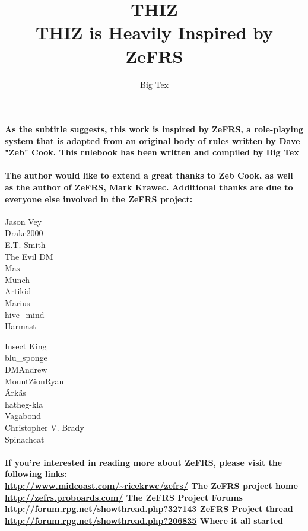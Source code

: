 \documentclass[oneside]{book}
\begin{document}
\title{ {\Huge THIZ} \\ \vspace{2 mm} {\large THIZ is Heavily Inspired by ZeFRS}}
\date{}
\author{Big Tex}
\maketitle

\paragraph{As the subtitle suggests, this work is inspired by ZeFRS, a role-playing system that is adapted from an original body of rules written by Dave "Zeb" Cook. This rulebook has been written and compiled by Big Tex} 

\paragraph{The author would like to extend a great thanks to Zeb Cook, as well as the author of ZeFRS, Mark Krawec. Additional thanks are due to everyone else involved in the ZeFRS project: \\}

\begin{minipage}[t]{0.5\textwidth}
Jason Vey \\
Drake2000 \\ 
E.T. Smith \\
The Evil DM \\
Max \\
M\"{u}nch \\
Artikid \\
Marius \\
hive\_mind \\
Harmast
\end{minipage}
\begin{minipage}[t]{0.5\textwidth}
Insect King \\
blu\_sponge \\
DMAndrew \\
MountZionRyan \\
\"{A}rk\"{a}s \\
hatheg-kla \\
Vagabond \\
Christopher V. Brady \\
Spinachcat
\end{minipage}

\paragraph{If you're interested in reading more about ZeFRS, please visit the following links: \\
\url{http://www.midcoast.com/~ricekrwc/zefrs/} The ZeFRS project home\\
\url{http://zefrs.proboards.com/} The ZeFRS Project Forums \\
\url{http://forum.rpg.net/showthread.php?327143} ZeFRS Project thread \\
\url{http://forum.rpg.net/showthread.php?206835} Where it all started }
\end{document}
